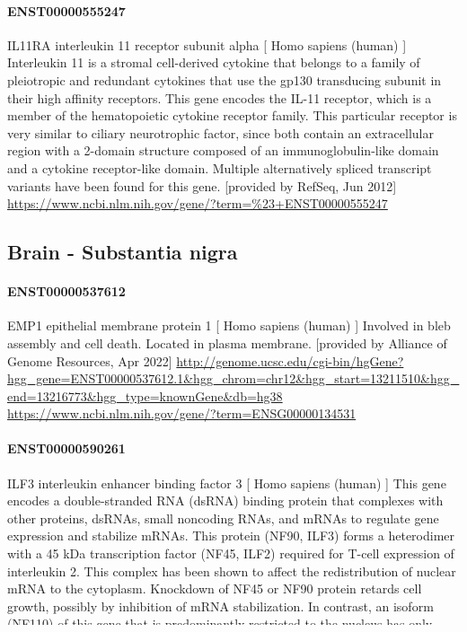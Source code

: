 \documentclass[
]{article}
\begin{document}
\hypertarget{enst00000555247}{%
\paragraph{ENST00000555247}\label{enst00000555247}}

IL11RA interleukin 11 receptor subunit alpha {[} Homo sapiens (human)
{]} Interleukin 11 is a stromal cell-derived cytokine that belongs to a
family of pleiotropic and redundant cytokines that use the gp130
transducing subunit in their high affinity receptors. This gene encodes
the IL-11 receptor, which is a member of the hematopoietic cytokine
receptor family. This particular receptor is very similar to ciliary
neurotrophic factor, since both contain an extracellular region with a
2-domain structure composed of an immunoglobulin-like domain and a
cytokine receptor-like domain. Multiple alternatively spliced transcript
variants have been found for this gene. {[}provided by RefSeq, Jun
2012{]}
\url{https://www.ncbi.nlm.nih.gov/gene/?term=\%23+ENST00000555247}

\hypertarget{brain---substantia-nigra}{%
\subsection{Brain - Substantia nigra}\label{brain---substantia-nigra}}

\hypertarget{enst00000537612}{%
\paragraph{ENST00000537612}\label{enst00000537612}}

EMP1 epithelial membrane protein 1 {[} Homo sapiens (human) {]} Involved
in bleb assembly and cell death. Located in plasma membrane. {[}provided
by Alliance of Genome Resources, Apr 2022{]}
\url{http://genome.ucsc.edu/cgi-bin/hgGene?hgg_gene=ENST00000537612.1\&hgg_chrom=chr12\&hgg_start=13211510\&hgg_end=13216773\&hgg_type=knownGene\&db=hg38}
\url{https://www.ncbi.nlm.nih.gov/gene/?term=ENSG00000134531}

\hypertarget{enst00000590261}{%
\paragraph{ENST00000590261}\label{enst00000590261}}

ILF3 interleukin enhancer binding factor 3 {[} Homo sapiens (human) {]}
This gene encodes a double-stranded RNA (dsRNA) binding protein that
complexes with other proteins, dsRNAs, small noncoding RNAs, and mRNAs
to regulate gene expression and stabilize mRNAs. This protein (NF90,
ILF3) forms a heterodimer with a 45 kDa transcription factor (NF45,
ILF2) required for T-cell expression of interleukin 2. This complex has
been shown to affect the redistribution of nuclear mRNA to the
cytoplasm. Knockdown of NF45 or NF90 protein retards cell growth,
possibly by inhibition of mRNA stabilization. In contrast, an isoform
(NF110) of this gene that is predominantly restricted to the nucleus has
only minor effects on cell growth when its levels are reduced.
Alternative splicing results in multiple transcript variants encoding
distinct isoforms.{[}provided by RefSeq, Dec 2014{]}
\url{https://www.ncbi.nlm.nih.gov/gene/?term=ENST00000590261}
\end{document}
